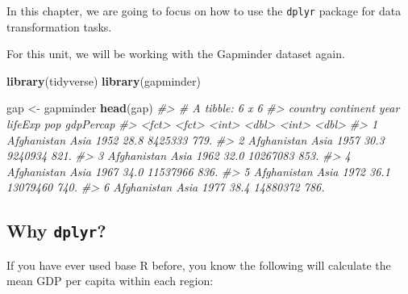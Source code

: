 \documentclass[
]{book}
\newenvironment{Shaded}{\begin{snugshade}}{\end{snugshade}}
\newcommand{\CommentTok}[1]{\textcolor[rgb]{0.56,0.35,0.01}{\textit{#1}}}
\newcommand{\KeywordTok}[1]{\textcolor[rgb]{0.13,0.29,0.53}{\textbf{#1}}}
\newcommand{\NormalTok}[1]{#1}
\newcommand{\OperatorTok}[1]{\textcolor[rgb]{0.81,0.36,0.00}{\textbf{#1}}}
\newcommand{\StringTok}[1]{\textcolor[rgb]{0.31,0.60,0.02}{#1}}
\begin{document}
In this chapter, we are going to focus on how to use the \texttt{dplyr} package for data transformation tasks.

For this unit, we will be working with the Gapminder dataset again.

\begin{Shaded}
\begin{Highlighting}[]
\KeywordTok{library}\NormalTok{(tidyverse)}
\KeywordTok{library}\NormalTok{(gapminder)}

\NormalTok{gap <-}\StringTok{ }\NormalTok{gapminder}
\KeywordTok{head}\NormalTok{(gap)}
\CommentTok{#> # A tibble: 6 x 6}
\CommentTok{#>   country     continent  year lifeExp      pop gdpPercap}
\CommentTok{#>   <fct>       <fct>     <int>   <dbl>    <int>     <dbl>}
\CommentTok{#> 1 Afghanistan Asia       1952    28.8  8425333      779.}
\CommentTok{#> 2 Afghanistan Asia       1957    30.3  9240934      821.}
\CommentTok{#> 3 Afghanistan Asia       1962    32.0 10267083      853.}
\CommentTok{#> 4 Afghanistan Asia       1967    34.0 11537966      836.}
\CommentTok{#> 5 Afghanistan Asia       1972    36.1 13079460      740.}
\CommentTok{#> 6 Afghanistan Asia       1977    38.4 14880372      786.}
\end{Highlighting}
\end{Shaded}

\hypertarget{why-dplyr}{%
\subsection{\texorpdfstring{Why \texttt{dplyr}?}{Why dplyr?}}\label{why-dplyr}}

If you have ever used base R before, you know the following will calculate the mean GDP per capita within each region:

\begin{Shaded}
\end{Shaded}
\end{document}
